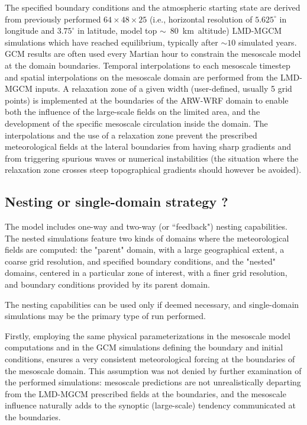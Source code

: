 \sk
The specified boundary conditions and the atmospheric starting state are derived from previously performed $64\times48\times25$ (i.e., horizontal resolution of $5.625^{\circ}$ in longitude and $3.75^{\circ}$ in latitude, model top $\sim$~80~km~altitude) LMD-MGCM simulations which have reached equilibrium, typically after $\sim 10$ simulated years. GCM results are often used every Martian hour to constrain the mesoscale model at the domain boundaries. Temporal interpolations to each mesoscale timestep and spatial interpolations on the mesoscale domain are performed from the LMD-MGCM inputs. A relaxation zone of a given width (user-defined, usually 5 grid points) is implemented at the boundaries of the ARW-WRF domain to enable both the influence of the large-scale fields on the limited area, and the development of the specific mesoscale circulation inside the domain. The interpolations and the use of a relaxation zone prevent the prescribed meteorological fields at the lateral boundaries from having sharp gradients and from triggering spurious waves or numerical instabilities (the situation where the relaxation zone crosses steep topographical gradients should however be avoided).

\mk
\subsection{Nesting or single-domain strategy ?}
\label{ssc:nestingvalid}

\sk
The model includes one-way and two-way (or ``feedback") nesting capabilities. The nested simulations feature two kinds of domains where the meteorological fields are computed: the "parent" domain, with a large geographical extent, a coarse grid resolution, and specified boundary conditions, and the "nested" domains, centered in a particular zone of interest, with a finer grid resolution, and boundary conditions provided by its parent domain.

\sk
The nesting capabilities can be used only if deemed necessary, and single-domain simulations may be the primary type of run performed.

\sk
Firstly, employing the same physical parameterizations in the mesoscale model computations and in the GCM simulations defining the boundary and initial conditions, ensures a very consistent meteorological forcing at the boundaries of the mesoscale domain. This assumption was not denied by further examination of the performed simulations: mesoscale predictions are not unrealistically departing from the LMD-MGCM prescribed fields at the boundaries, and the mesoscale influence naturally adds to the synoptic (large-scale) tendency communicated at the boundaries. 

